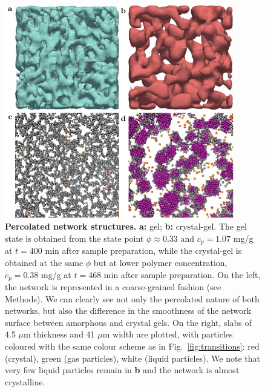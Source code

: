 \documentclass[preprint,amsmath,amssymb,superscriptaddress]{revtex4-1}
\begin{document}
% 

\begin{figure}
 \includegraphics[width=10cm]{network}
\caption{{\bf Percolated network structures.} {\bf a:} gel; {\bf b:} crystal-gel. The gel state is obtained from the state
point $\phi\approx 0.33$ and $c_p=1.07$ mg/g at $t=400$ min after sample preparation, while the crystal-gel is obtained at the same $\phi$ but
at lower polymer concentration, $c_p=0.38$ mg/g at $t=468$ min after sample preparation. On the left, the network is represented in a coarse-grained fashion (see Methods). 
We can clearly see not only the percolated nature of both networks, but also the difference in the smoothness of the network surface between amorphous and crystal gels. 
On the right, slabs of 4.5 $\mu$m thickness and 41 $\mu$m width are plotted, with particles coloured with the same colour scheme as in Fig.~\ref{fig:transitions}: red (crystal), green (gas particles), white (liquid particles). 
We note that very few liquid particles remain in \textbf{b} and the network is almost crystalline. 
} 
\label{fig:network}
\end{figure}
\end{document}
